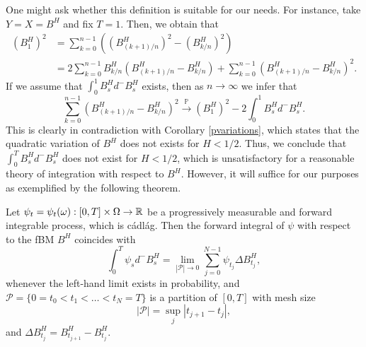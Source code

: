 One might ask whether this definition is suitable for our needs. For instance, take $Y=X=B^{H}$ and fix $T=1$. Then, we obtain that
\begin{align}
    (B_{1}^{H})^{2}&=\sum_{k=0}^{n-1}\left((B_{(k+1)/n}^{H})^{2}-(B_{k/n}^{H})^{2}\right)\\
    &=2\sum_{k=0}^{n-1}B_{k/n}^{H}(B_{(k+1)/n}^{H}-B_{k/n}^{H})+\sum_{k=0}^{n-1}(B_{(k+1)/n}^{H}-B_{k/n}^{H})^{2}.
\end{align}
If we assume that $\int_{0}^{1}B_{s}^{H}d^{-}B_{s}^{H}$ exists, then as $n\to\infty$ we infer that
\begin{equation}
    \sum_{k=0}^{n-1}(B_{(k+1)/n}^{H}-B_{k/n}^{H})^{2}\overset{\mathbb{P}}{\to} (B_{1}^{H})^{2}-2\int_{0}^{1}B_{s}^{H}d^{-}B_{s}^{H}.
\end{equation}
This is clearly in contradiction with Corollary \ref{pvariations}, which states that the quadratic variation of $B^{H}$ does not exists for $H<1/2$. Thus, we conclude that $\int_{0}^{T}B^{H}_{s}d^{-}B^{H}_{s}$ does not exist for $H<1/2$, which is unsatisfactory for a reasonable theory of integration with respect to $B^H$. However, it will suffice for our purposes as exemplified by the following theorem.
\begin{prop}\label{thm:integration}
    Let $\psi_{t}=\psi_{t}(\omega):[0,T]\times \Omega\to \mathbb{R}$ be a progressively measurable and forward integrable process, which is cádlág. Then the forward integral of $\psi$ with respect to the fBM $B^{H}$ coincides with
    \begin{equation}
        \int_{0}^{T}\psi_{s}d^{-}B^{H}_{s}=\lim_{|\mathcal{P}|\to 0}\sum_{j=0}^{N-1}\psi_{t_{j}}\Delta B^{H}_{t_{j}},
    \end{equation}
    whenever the left-hand limit exists in probability, and $\mathcal{P}=\{0=t_{0}<t_{1}<\dots <t_{N}=T\}$ is a partition of $[0,T]$ with mesh size
    \begin{equation}
        |\mathcal{P}|=\sup_{j}|t_{j+1}-t_{j}|,
    \end{equation}
    and $\Delta B^{H}_{t_{j}}=B_{t_{j+1}}^{H}-B_{t_{j}}^{H}$.
\end{prop}
